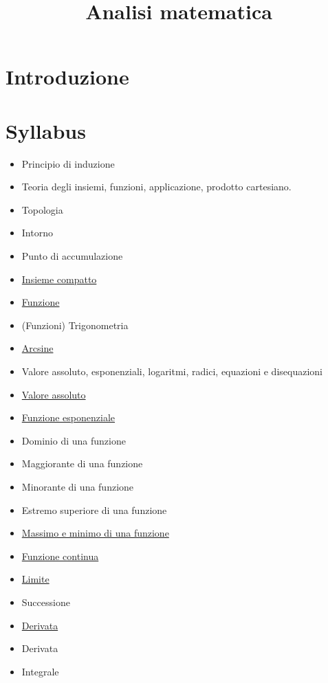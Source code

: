 \documentclass[a4paper,10pt]{article}
\title{Analisi matematica}
\author{}
\begin{document}
\maketitle


\section{Introduzione}

\section{Syllabus}
\begin{itemize}
 \item Principio di induzione
 \item Teoria degli insiemi, funzioni, applicazione, prodotto cartesiano.
 \item Topologia
 \item Intorno
 \item Punto di accumulazione
 \item \href{InsiemeCompatto.html}{Insieme compatto}
 \item \href{Function.html}{Funzione}
 \item (Funzioni) Trigonometria
 \item \href{Arcsine.html}{Arcsine}
 \item Valore assoluto, esponenziali, logaritmi, radici, equazioni e disequazioni
 \item \href{./ValoreAssoluto.html}{Valore assoluto}
 \item \href{./FunzioneEsponenziale.html}{Funzione esponenziale}
 \item Dominio di una funzione
 \item Maggiorante di una funzione
 \item Minorante di una funzione
 \item Estremo superiore di una funzione
 \item \href{FunzioneMassimoMinimo.html}{Massimo e minimo di una funzione}
 \item \href{FunzioneContinua.html}{Funzione continua}
 \item \href{Limite.html}{Limite}
 \item Successione
 \item \href{Derivata.html}{Derivata} 
 \item Derivata
 \item Integrale
\end{itemize}
\end{document}
